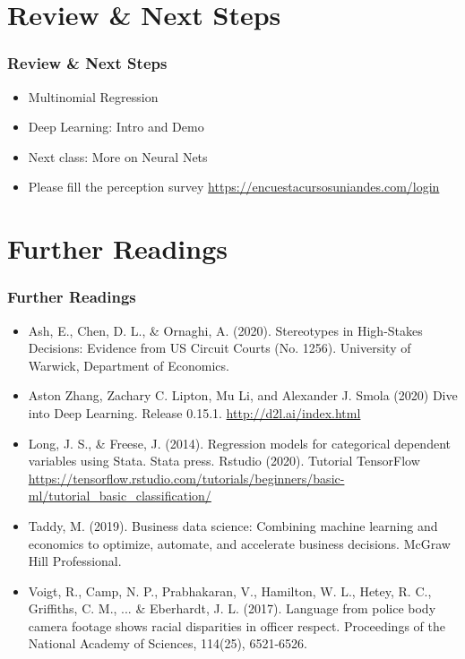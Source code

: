 \documentclass[
  shownotes,
  xcolor={svgnames},
  hyperref={colorlinks,citecolor=DarkBlue,linkcolor=DarkRed,urlcolor=DarkBlue}
  , aspectratio=169]{beamer}
\begin{document}
\section{Review
 \& Next Steps}
\begin{frame}
\frametitle{Review \& Next Steps}
  
\begin{itemize} 
  
\item  Multinomial Regression
\bigskip
\item  Deep Learning: Intro and Demo

    \bigskip  
  \item  Next class:  More on Neural Nets

\bigskip  
\item Please fill the perception survey \url{https://encuestacursosuniandes.com/login}


\end{itemize}
\end{frame}


\section{Further Readings}
\begin{frame}
\frametitle{Further Readings}

\begin{itemize}
\footnotesize

  \item Ash, E., Chen, D. L., \& Ornaghi, A. (2020). Stereotypes in High-Stakes Decisions: Evidence from US Circuit Courts (No. 1256). University of Warwick, Department of Economics.
  \medskip
  \item Aston Zhang, Zachary C. Lipton, Mu Li, and Alexander J. Smola (2020) Dive into Deep Learning. Release 0.15.1. \url{http://d2l.ai/index.html}
  \medskip
  \item Long, J. S., \& Freese, J. (2014). Regression models for categorical dependent variables using Stata. Stata press.
  \medskip
  Rstudio (2020). Tutorial TensorFlow \url{https://tensorflow.rstudio.com/tutorials/beginners/basic-ml/tutorial_basic_classification/}
  \medskip
  \item Taddy, M. (2019). Business data science: Combining machine learning and economics to optimize, automate, and accelerate business decisions. McGraw Hill Professional.
  \medskip
  \item Voigt, R., Camp, N. P., Prabhakaran, V., Hamilton, W. L., Hetey, R. C., Griffiths, C. M., ... \& Eberhardt, J. L. (2017). Language from police body camera footage shows racial disparities in officer respect. Proceedings of the National Academy of Sciences, 114(25), 6521-6526.

  
\end{itemize}

\end{frame}
\end{document}
